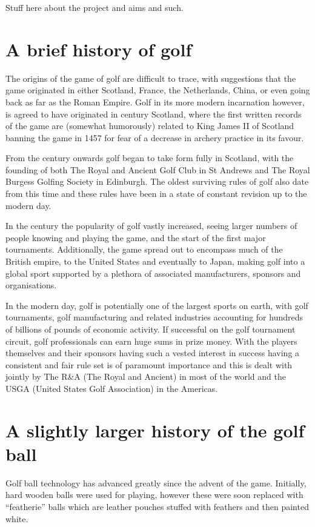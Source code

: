 Stuff here about the project and aims and such.

\section{A brief history of golf}

The origins of the game of golf are difficult to trace, with suggestions that the game originated
in either Scotland, France, the Netherlands, China, or even going back as far as the Roman Empire.
Golf in its more modern incarnation however, is agreed to have originated in  century
Scotland, where the first written records of the game are (somewhat humorously) related to
King James II of Scotland banning the game in 1457 for fear of a decrease in archery practice
in its favour.

From the  century onwards golf began to take form fully in Scotland, with the founding
of both The Royal and Ancient Golf Club in St Andrews and The Royal Burgess Golfing Society
in Edinburgh. The oldest surviving rules of golf also date from this time and these rules have been
in a state of constant revision up to the modern day.

In the  century the popularity of golf vastly increased, seeing larger numbers of people
knowing and playing the game, and the start of the first major tournaments. Additionally, the
game spread out to encompass much of the British empire, to the United States and eventually to
Japan, making golf into a global sport supported by a plethora of associated manufacturers, sponsors
and organisations.

In the modern day, golf is potentially one of the largest sports on earth, with golf tournaments,
golf manufacturing and related industries accounting for hundreds of billions of pounds of
economic activity. If successful on the golf tournament circuit, golf professionals can earn huge sums
in prize money. With the players themselves and their sponsors having such a vested interest in success
having a consistent and fair rule set is of paramount importance and this is dealt with jointly by 
The R\&A (The Royal and Ancient) in most of the world and the USGA (United States Golf Association) 
in the Americas.

\section{A slightly larger history of the golf ball}

Golf ball technology has advanced greatly since the advent of the game. Initially, hard wooden
balls were used for playing, however these were soon replaced with “featherie” balls which are
leather pouches stuffed with feathers and then painted white.

